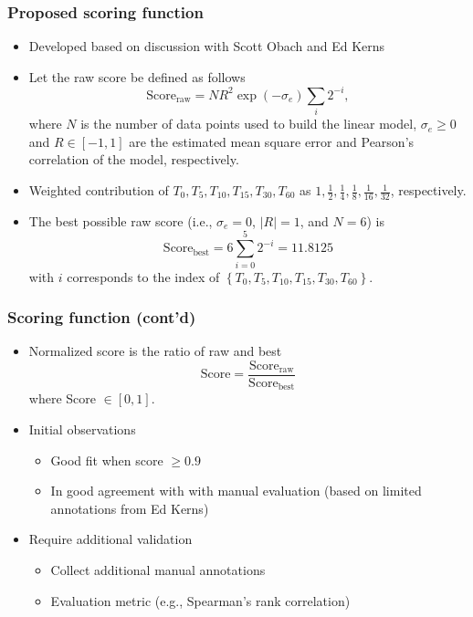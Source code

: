 \documentclass{beamer}
\begin{document}
\begin{frame}
\frametitle{Proposed scoring function}
\begin{itemize}
\item Developed based on discussion with Scott Obach and Ed Kerns
\item Let the raw score be defined as follows
\begin{equation}
\textrm{Score}_{\textrm{raw}} = NR^2\exp(-\sigma_e)\sum_i 2^{-i},
\end{equation}
where $N$ is the number of data points used to build the linear model,
$\sigma_e \ge 0$ and $R \in [-1,1]$ are the estimated mean square
error and Pearson's correlation of the model, respectively. 
\item Weighted contribution of $T_0, T_5, T_{10}, T_{15}, T_{30},
  T_{60}$ as $1, \frac{1}{2}, \frac{1}{4},
  \frac{1}{8},\frac{1}{16},\frac{1}{32}$, respectively.
\item The best possible raw score (i.e., $\sigma_e = 0$, $|R| = 1$, and
  $N = 6$) is 
\[ \textrm{Score}_{\textrm{best}} = 6\sum_{i=0}^5 2^{-i} = 11.8125\]
with $i$ corresponds to the index of $\left\{T_0,T_5, T_{10},
  T_{15}, T_{30}, T_{60}\right\}$.
\end{itemize}
\end{frame}

\begin{frame}
\frametitle{Scoring function (cont'd)}
\begin{itemize}
\item Normalized score is the ratio of raw and best
\[ \textrm{Score} = \frac{\textrm{Score}_{\textrm{raw}}}%
{\textrm{Score}_{\textrm{best}}}\]
where Score $\in [0, 1]$.
\item Initial observations
\begin{itemize}
\item Good fit when score $\ge 0.9$
\item In good agreement with with manual evaluation (based on limited
  annotations from Ed Kerns)
\end{itemize}
\item Require additional validation
\begin{itemize}
\item Collect additional manual annotations 
\item Evaluation metric (e.g., Spearman's rank correlation)
\end{itemize}
\end{itemize}
\end{frame}
\end{document}
